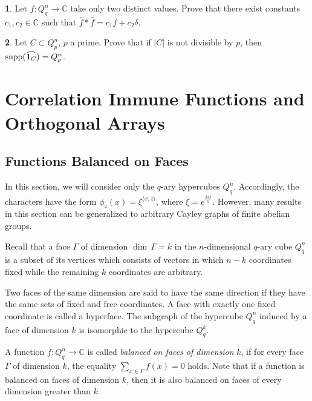 \documentclass[11pt]{article}
\theoremstyle{definition}
\newtheorem{exercise}{\quad}
\newcommand{\supp}{{\rm supp}}
\begin{document}
{{{\begin{exercise}
Let $f: Q^n_q\rightarrow \mathbb{C}$ take only two distinct values. Prove that there exist constants $c_1, c_2 \in \mathbb{C}$ such that $\widehat{f}*\widehat{f}=c_1 \widehat{f}+ c_2\delta$.
\end{exercise}

\begin{exercise}
Let $C\subset Q^n_p$, $p$ a prime. Prove that if $|C|$ is not divisible by $p$, then $\supp(\widehat{{\mathbf 1}_{C}})=Q^n_p$.
\end{exercise}





\section{Correlation Immune Functions and Orthogonal Arrays}

\subsection{Functions Balanced on Faces}

In this section, we will consider only the $q$-ary hypercubes $Q_q^n$. Accordingly, the characters have the form
$\phi_z(x)=\xi^{\langle x,z\rangle}$, where $\xi=e^\frac{2\pi i}{q}$.
However, many results in this section can be generalized to arbitrary Cayley graphs of finite abelian groups.

Recall that a face $\Gamma$ of dimension $\dim\,\Gamma = k$ in
the $n$-dimensional $q$-ary cube $Q_q^n$
is a subset of its vertices
which consists of vectors in which $n-k$
coordinates fixed while  the remaining $k$
coordinates are arbitrary.

Two faces of the same dimension are said to have the same
direction if they have the same sets of fixed and free coordinates.
 A face with exactly one fixed coordinate
is called a hyperface. The subgraph of the hypercube $Q_q^n$ induced by a face of dimension $k$ is isomorphic to the hypercube $Q_q^k$.

    A function $f: Q_q^n\rightarrow \mathbb{C}$ is called
    {\sl balanced on faces of dimension} $k$,
    if for every face $\Gamma$ of dimension $k$,
    the equality $\sum\limits_{x\in\Gamma}f(x)=0$ holds.
Note that if a function is balanced on faces of dimension $k$, then
it is also balanced on faces of every dimension greater than $k$.

}}}
\end{document}
